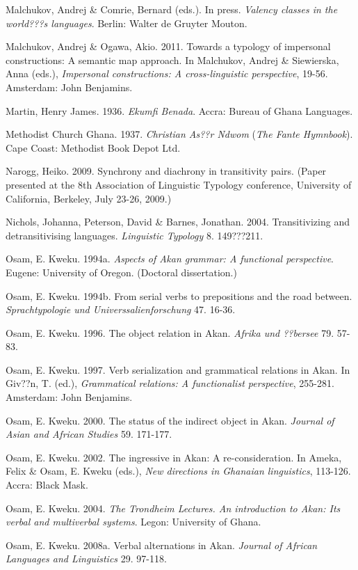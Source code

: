 \documentclass[output=paper]{langsci/langscibook}
\begin{document}
Malchukov, Andrej \& Comrie, Bernard (eds.). In press. \textit{Valency classes in the world???s languages}. Berlin: Walter de Gruyter Mouton.

Malchukov, Andrej \& Ogawa, Akio. 2011. Towards a typology of impersonal constructions: A semantic map approach. In Malchukov, Andrej \& Siewierska, Anna (eds.), \textit{Impersonal constructions: A cross-linguistic perspective}, 19-56. Amsterdam: John Benjamins.

Martin, Henry James. 1936. \emph{Ekumfi Benada}. Accra: Bureau of Ghana Languages.

Methodist Church Ghana. 1937. \textit{Christian As??r Ndwom }(\textit{The Fante Hymnbook}). Cape Coast: Methodist Book Depot Ltd.

Narogg, Heiko. 2009. Synchrony and diachrony in transitivity pairs. (Paper presented at the 8th Association of Linguistic Typology conference, University of California, Berkeley, July 23-26, 2009.)

Nichols, Johanna, Peterson, David \& Barnes, Jonathan. 2004. Transitivizing and detransitivising languages. \textit{Linguistic Typology} 8. 149???211.

Osam, E. Kweku. 1994a. \textit{Aspects of Akan grammar: A functional perspective}. Eugene: University of Oregon. (Doctoral dissertation.)

Osam, E. Kweku. 1994b. From serial verbs to prepositions and the road between. \textit{Sprachtypologie und Universsalienforschung} 47. 16-36.

Osam, E. Kweku. 1996. The object relation in Akan. \textit{Afrika und ??bersee} 79. 57-83.

Osam, E. Kweku. 1997. Verb serialization and grammatical relations in Akan. In Giv??n, T. (ed.), \textit{Grammatical relations: A functionalist perspective}, 255-281. Amsterdam: John Benjamins.

Osam, E. Kweku. 2000. The status of the indirect object in Akan. \textit{Journal of Asian and African Studies }59. 171-177.

Osam, E. Kweku. 2002. The ingressive in Akan: A re-consideration. In Ameka, Felix \& Osam, E. Kweku (eds.), \textit{New directions in Ghanaian linguistics}, 113-126. Accra: Black Mask.

Osam, E. Kweku. 2004. \textit{The Trondheim Lectures. An introduction to Akan: Its verbal and multiverbal systems}. Legon: University of Ghana.

Osam, E. Kweku. 2008a. Verbal alternations in Akan. \textit{Journal of African Languages and Linguistics} 29. 97-118.
\end{document}
